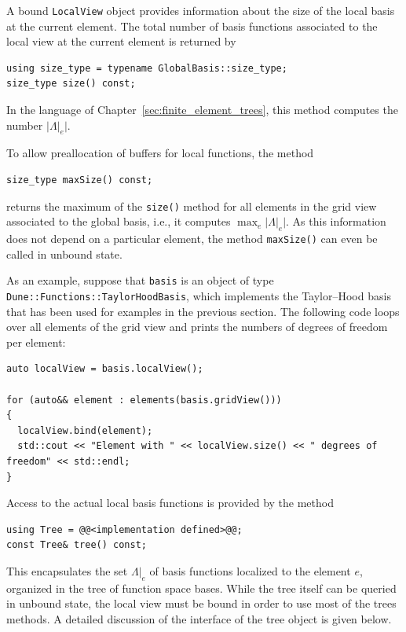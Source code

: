 \documentclass[a4paper,10pt,headings=normal,bibliography=totoc]{scrartcl}
\newcommand{\cpp}[1]{\lstinline[basicstyle=\ttfamily]!#1!}
\newcommand{\abs}[1]{{\lvert#1\rvert}}
\begin{document}
A bound \cpp{LocalView} object provides information
about the size of the local basis at the current element.
The total number of basis functions associated to the
local view at the current element is returned by
\begin{lstlisting}[style=Interface]
using size_type = typename GlobalBasis::size_type;
size_type size() const;
\end{lstlisting}
In the language of Chapter~\ref{sec:finite_element_trees}, this method computes
the number $\abs{\Lambda|_e}$.

To allow preallocation of buffers for local functions, the method
\begin{lstlisting}[style=Interface]
size_type maxSize() const;
\end{lstlisting}
returns the maximum of the
\cpp{size()} method for all elements in the grid view
associated to the global basis, i.e., it computes $\max_e \abs{\Lambda|_e}$.
As this information does not depend on a particular element,
the method \cpp{maxSize()} can even be called in unbound state.

As an example, suppose that \cpp{basis} is an object of type \cpp{Dune::Functions::TaylorHoodBasis},
which implements the Taylor--Hood basis that has been used for examples in the previous section.
The following code loops over all elements of the grid view and prints the numbers
of degrees of freedom per element:
\begin{lstlisting}[style=example]
auto localView = basis.localView();

for (auto&& element : elements(basis.gridView()))
{
  localView.bind(element);
  std::cout << "Element with " << localView.size() << " degrees of freedom" << std::endl;
}
\end{lstlisting}


Access to the actual local basis functions is provided
by the method
\begin{lstlisting}[style=Interface]
using Tree = @@<implementation defined>@@;
const Tree& tree() const;
\end{lstlisting}
This encapsulates the set $\Lambda|_e$ of basis functions localized to the
element $e$, organized in the tree of function space bases.
While the tree  itself can be queried in unbound state,
the local view must be bound in order to use most of the
trees methods.
A detailed discussion of the interface of the tree object is
given below.
\end{document}
